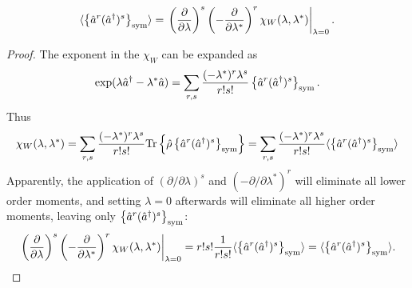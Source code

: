 \begin{lemma}
\label{lmm:formalism:sm-wigner:moments-from-chi}
\[
	\langle \left\{  \hat{a}^r (\hat{a}^\dagger)^s  \right\}_{\mathrm{sym}} \rangle
	= \left.
		\left( \frac{\partial}{\partial \lambda} \right)^s
		\left( -\frac{\partial}{\partial \lambda^*} \right)^r
		\chi_W (\lambda, \lambda^*)
	\right|_{\lambda=0}.
\]
\end{lemma}
\begin{proof}
The exponent in the $\chi_W$ can be expanded as
\[
	\exp (\lambda \hat{a}^\dagger - \lambda^* \hat{a})
	= \sum_{r,s}
		\frac{(-\lambda^*)^r \lambda^s}{r!s!}
		\left\{  \hat{a}^r (\hat{a}^\dagger)^s  \right\}_{\mathrm{sym}}.
\]
Thus
\[
	\chi_W(\lambda, \lambda^*)
	= \sum_{r,s}
		\frac{(-\lambda^*)^r \lambda^s}{r!s!}
		\mathrm{Tr} \left\{ 
			\hat{\rho} \left\{  \hat{a}^r (\hat{a}^\dagger)^s  \right\}_{\mathrm{sym}}
		 \right\}
	= \sum_{r,s}
		\frac{(-\lambda^*)^r \lambda^s}{r!s!}
		\langle \left\{  \hat{a}^r (\hat{a}^\dagger)^s  \right\}_{\mathrm{sym}} \rangle
\]
Apparently, the application of $(\partial / \partial \lambda)^s$ and $(-\partial / \partial \lambda^*)^r$ will eliminate all lower order moments,
and setting $\lambda = 0$ afterwards will eliminate all higher order moments,
leaving only $\left\{  \hat{a}^r (\hat{a}^\dagger)^s  \right\}_{\mathrm{sym}}$:
\[
	\left.
		\left( \frac{\partial}{\partial \lambda} \right)^s
		\left( -\frac{\partial}{\partial \lambda^*} \right)^r
		\chi_W (\lambda, \lambda^*)
	\right|_{\lambda=0}
	= r! s! \frac{1}{r! s!}
		\langle \left\{  \hat{a}^r (\hat{a}^\dagger)^s  \right\}_{\mathrm{sym}} \rangle
	= \langle \left\{  \hat{a}^r (\hat{a}^\dagger)^s  \right\}_{\mathrm{sym}} \rangle.
	\qedhere
\]
\end{proof}

